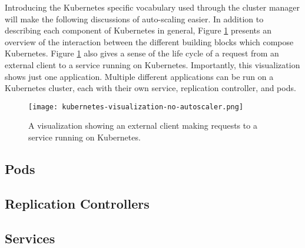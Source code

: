 Introducing the Kubernetes specific vocabulary used through the cluster manager
will make the following discussions of auto-scaling easier. In addition to
describing each component of Kubernetes in general, Figure
\ref{fig:kubernetes-visualization-no-autoscaler} presents an overview of the
interaction between the different building blocks which compose Kubernetes.
Figure \ref{fig:kubernetes-visualization-no-autoscaler} also gives a sense of
the life cycle of a request from an external client
to a service running on Kubernetes.
Importantly, this visualization shows just one application. Multiple different
applications can be run on a Kubernetes cluster, each with their own service,
replication controller, and pods.

\begin{figure}[!h]
  \centerline{\texttt{[image: kubernetes-visualization-no-autoscaler.png]}}
  \caption{A visualization showing an external client making requests to a
  service running on Kubernetes.}
  \label{fig:kubernetes-visualization-no-autoscaler}
\end{figure}

\subsection{Pods}



\subsection{Replication Controllers}



\subsection{Services}


